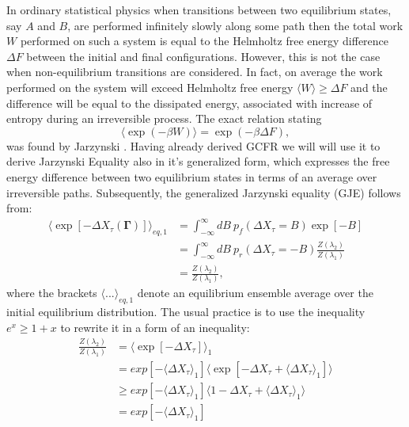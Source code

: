 \documentclass[a4paper,12pt]{article}
\begin{document}
In ordinary statistical physics when transitions between two equilibrium states, say $A$ and $B$, are performed infinitely slowly along some path then the total work $W$ performed on such a system is equal to the Helmholtz free energy difference $\Delta F$ between the initial and final configurations. However, this is not the case when non-equilibrium transitions are considered. In fact, on average the work performed on the system will exceed Helmholtz free energy $ \langle  W \rangle \geq \Delta F $ and the difference will be equal to the dissipated energy, associated with increase of entropy during an irreversible process. The exact relation stating
\begin{equation}
\label{JarzynskiInequality}
  \langle \exp(-\beta W) \rangle = \exp(-\beta  \Delta F),
\end{equation}
was found by Jarzynski \cite{Jarzynski:1997uj}.
Having already derived GCFR we will will use it to derive Jarzynski Equality also in it's generalized form, which expresses the free energy difference between two equilibrium states in terms of an average over irreversible paths.
Subsequently, the generalized Jarzynski equality (GJE) follows from:
\begin{equation}
\begin{aligned}
  \langle \exp[-\Delta X_{\tau}(\bm{\Gamma})] \rangle_{eq,1} 
  &= \int_{-\infty}^{\infty} dB\ p_f(\Delta X_\tau =B)\exp[-B]\\
 &= \int_{-\infty}^{\infty} dB\ p_r(\Delta X_\tau =-B)\frac{Z(\lambda_2)}{Z(\lambda_1)}\\
 &=\frac{Z(\lambda_2)}{Z(\lambda_1)},
\end{aligned}
\end{equation}
where the brackets $\langle ... \rangle_{eq,1}$ denote an equilibrium ensemble average over the initial equilibrium distribution.
The usual practice is to use the inequality $e^x \geq 1+x $ to rewrite it in a form of an inequality:
\begin{equation}
\begin{aligned}
  \frac{Z(\lambda_2)}{Z(\lambda_1)} &=\langle \exp[-\Delta X_\tau ]\rangle_1 \\
  &=exp[-\langle\Delta X_\tau \rangle_1]\langle \exp[-\Delta X_\tau + \langle \Delta X_\tau \rangle_1]\rangle \\
  &\geq exp[-\langle\Delta X_\tau \rangle_1]\langle 1- \Delta X_\tau + \langle \Delta X_\tau \rangle_1 \rangle \\
  &=exp[-\langle\Delta X_\tau \rangle_1]
\end{aligned}
\end{equation}
\end{document}
